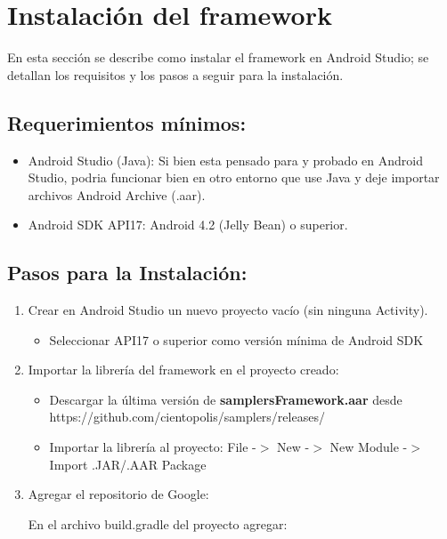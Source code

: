 \chapter{Instalación del framework}
En esta sección se describe como instalar el framework en Android Studio; se detallan los requisitos y los pasos a seguir para la instalación.

\section{Requerimientos mínimos:}

\begin{itemize}
\item Android Studio (Java): Si bien esta pensado para y probado en Android Studio, podria funcionar bien en otro entorno que use Java y deje importar archivos Android Archive (.aar).
\item Android SDK API17: Android 4.2 (Jelly Bean) o superior.
\end{itemize}

\section{Pasos para la Instalación:}

\begin{enumerate}
	\item Crear en Android Studio un nuevo proyecto vacío (sin ninguna Activity).
		\begin{itemize}
		\item Seleccionar API17 o superior como versión mínima de Android SDK
		\end{itemize}
		
		
	\item Importar la librería del framework en el proyecto creado:
		\begin{itemize}
		\item Descargar la última versión de \textbf{samplersFramework.aar} desde https://github.com/cientopolis/samplers/releases/
		\item Importar la librería al proyecto: File -$>$ New -$>$ New Module -$>$ Import .JAR/.AAR Package
		\end{itemize}
		
\clearpage		
		
	\item Agregar el repositorio de Google:
	
		En el archivo build.gradle del proyecto agregar: 
\end{enumerate}	
		
